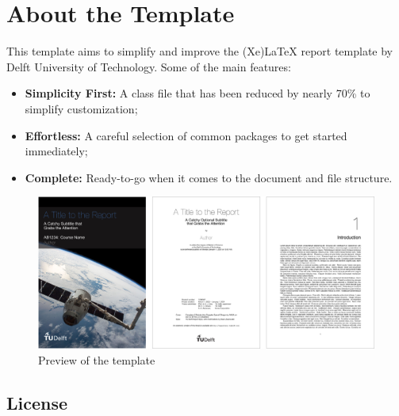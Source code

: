 \chapter{About the Template}

This template aims to simplify and improve the (Xe)LaTeX report template by Delft University of Technology. Some of the main features:

\begin{itemize}
  \item \textbf{Simplicity First:} A class file that has been reduced by nearly 70\% to simplify customization;
  \item \textbf{Effortless:} A careful selection of common packages to get started immediately;
  \item \textbf{Complete:} Ready-to-go when it comes to the document and file structure.
\end{itemize}


\begin{figure}[h]
    \centering
    \includegraphics[width=0.95\linewidth]{figures/template.png}
    \caption{Preview of the template}
\end{figure}

\section*{License}


